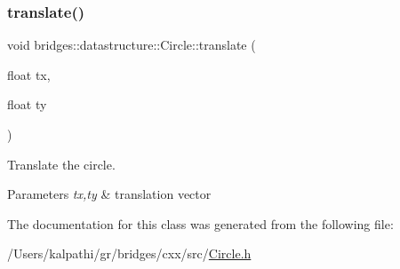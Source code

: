\subsubsection{\texorpdfstring{translate()}{translate()}}
{\footnotesize\ttfamily void bridges\+::datastructure\+::\+Circle\+::translate (\begin{DoxyParamCaption}\item[{float}]{tx,  }\item[{float}]{ty }\end{DoxyParamCaption})\hspace{0.3cm}{\ttfamily [inline]}}



Translate the circle. 


\begin{DoxyParams}{Parameters}
{\em tx,ty} & translation vector \\
\hline
\end{DoxyParams}


The documentation for this class was generated from the following file\+:\begin{DoxyCompactItemize}
\item 
/\+Users/kalpathi/gr/bridges/cxx/src/\mbox{\hyperlink{_circle_8h}{Circle.\+h}}\end{DoxyCompactItemize}
